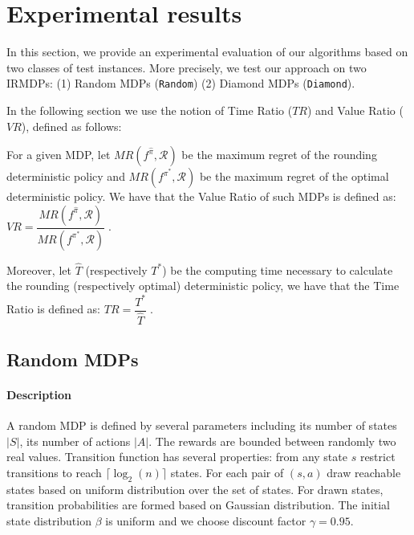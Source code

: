 \section{Experimental results}\label{sec:experiments}

In this section, we provide an experimental evaluation of our algorithms based on two classes of test instances. More precisely, we test our approach on two IRMDPs: (1) Random MDPs (\texttt{Random}) (2) Diamond MDPs (\texttt{Diamond}).

 

In the following section we use the notion of Time Ratio ($TR$) and Value Ratio ($VR$), defined as follows:

\begin{definition}
For a given MDP, let $MR(f^{\hat{\pi}}, \mathcal{R})$ be the maximum regret of the rounding deterministic policy and $MR(f^{\pi^*}, \mathcal{R})$  be the maximum regret of the optimal deterministic policy. We have that the Value Ratio of such MDPs is defined as: $VR = \dfrac{MR(f^{\hat{\pi}}, \mathcal{R})}{MR(f^{\pi^*}, \mathcal{R})}\;$.

Moreover, let $\hat{T}$ (respectively $T^*$) be the computing time necessary to calculate the rounding (respectively optimal) deterministic policy, we have that the Time Ratio is defined as: $TR=\dfrac{T^*}{\hat{T}}\;$.

 
\end{definition}

\subsection{Random MDPs}
\paragraph{Description}
A random MDP is defined by several parameters including its number of states $|S|$, its number of actions $|A|$. The rewards are bounded between randomly two real values. Transition function has several properties: from any state $s$ restrict transitions to reach $\lceil \log_2(n) \rceil$ states. For each pair of $(s, a)$ draw reachable states based on uniform distribution over the set of states. For drawn states, transition probabilities are formed based on Gaussian distribution. The initial state distribution $\beta$ is uniform and we choose discount factor $\gamma = 0.95$. 
